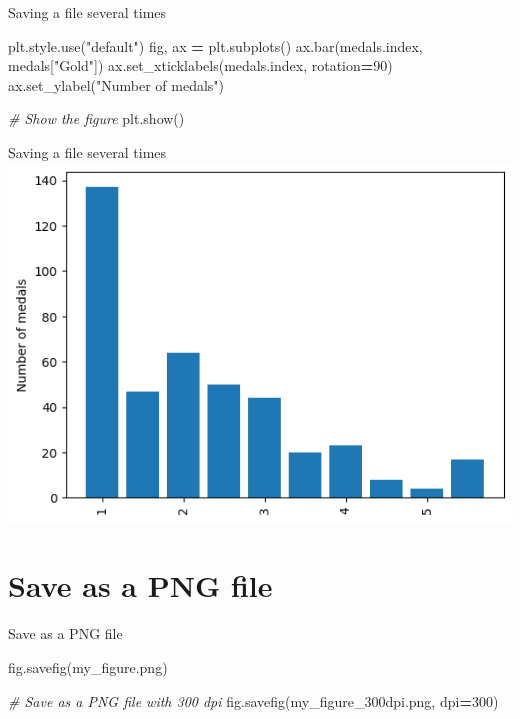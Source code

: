 \documentclass[
  ignorenonframetext,
]{beamer}
\newenvironment{Shaded}{\begin{snugshade}}{\end{snugshade}}
\newcommand{\CommentTok}[1]{\textcolor[rgb]{0.56,0.35,0.01}{\textit{#1}}}
\newcommand{\DecValTok}[1]{\textcolor[rgb]{0.00,0.00,0.81}{#1}}
\newcommand{\NormalTok}[1]{#1}
\newcommand{\OperatorTok}[1]{\textcolor[rgb]{0.81,0.36,0.00}{\textbf{#1}}}
\newcommand{\StringTok}[1]{\textcolor[rgb]{0.31,0.60,0.02}{#1}}
\begin{document}
\begin{frame}[fragile]{Saving a file several times}
\label{saving-a-file-several-times-2}

\begin{Shaded}
\begin{Highlighting}[]
\NormalTok{plt.style.use(}\StringTok{"default"}\NormalTok{)}
\NormalTok{fig, ax }\OperatorTok{=}\NormalTok{ plt.subplots()}
\NormalTok{ax.bar(medals.index, medals[}\StringTok{"Gold"}\NormalTok{])}
\NormalTok{ax.set\_xticklabels(medals.index, rotation}\OperatorTok{=}\DecValTok{90}\NormalTok{)}
\NormalTok{ax.set\_ylabel(}\StringTok{"Number of medals"}\NormalTok{)}

\CommentTok{\# Show the figure}
\NormalTok{plt.show()}
\end{Highlighting}
\end{Shaded}
\end{frame}

\begin{frame}{Saving a file several times}
\label{saving-a-file-several-times-3}
\includegraphics{../images/im251.png}
\end{frame}

\section{Save as a PNG file}\label{save-as-a-png-file}

\begin{frame}[fragile]{Save as a PNG file}
\label{save-as-a-png-file-1}

\begin{Shaded}
\begin{Highlighting}[]
\NormalTok{fig.savefig(}\StringTok{\textquotesingle{}my\_figure.png\textquotesingle{}}\NormalTok{)}

\CommentTok{\# Save as a PNG file with 300 dpi}
\NormalTok{fig.savefig(}\StringTok{\textquotesingle{}my\_figure\_300dpi.png\textquotesingle{}}\NormalTok{, dpi}\OperatorTok{=}\DecValTok{300}\NormalTok{)}
\end{Highlighting}
\end{Shaded}
\end{frame}
\end{document}
